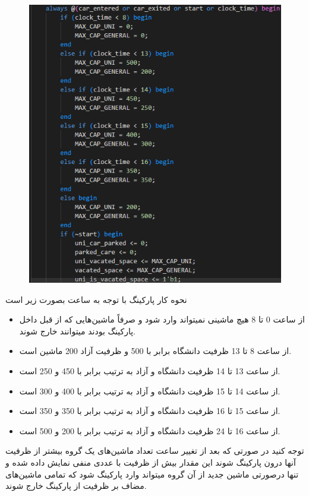 \documentclass{article}
\begin{document}
\begin{enumerate}[label=\textbf{\alph*)}]
\begin{figure}[H]
\begin{minipage}{0.5\textwidth}
            \includegraphics[width=\textwidth]{Parking2.png}
        \end{minipage}
    \end{figure}
نحوه کار پارکینگ با توجه به ساعت بصورت زیر است
\begin{itemize}
    \item از ساعت 0 تا 8 هیچ ماشینی نمیتواند وارد شود و صرفاً ماشین‌هایی که از قبل داخل پارکینگ بودند
    میتوانند خارج شوند.
    \item از ساعت 8 تا 13 ظرفیت دانشگاه برابر با 500 و ظرفیت آزاد 200 ماشین است.
    \item از ساعت 13 تا 14 ظرفیت دانشگاه و آزاد به ترتیب برابر با 450 و 250 است.
    \item از ساعت 14 تا 15 ظرفیت دانشگاه و آزاد به ترتیب برابر با 400 و 300 است.
    \item از ساعت 15 تا 16 ظرفیت دانشگاه و آزاد به ترتیب برابر با 350 و 350 است.
    \item از ساعت 16 تا 24 ظرفیت دانشگاه و آزاد به ترتیب برابر با 200 و 500 است.
\end{itemize}
توجه کنید در صورتی که بعد از تغییر ساعت تعداد ماشین‌های یک گروه بیشتر از ظرفیت آنها درون پارکینگ شوند این مقدار بیش از ظرفیت با عددی منفی نمایش داده شده 
و تنها درصورتی ماشین جدید از آن گروه میتواند وارد پارکینگ شود که تمامی ماشین‌های مضاف بر
ظرفیت از پارکینگ خارج شوند.


\end{enumerate}
\end{document}
